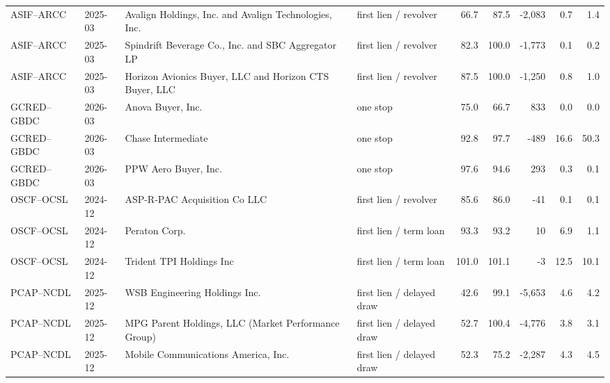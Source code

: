 \documentclass[12pt]{standalone}
\begin{document}
\begin{tabular}{ll>{\raggedright\arraybackslash}p{4.3cm}>{\raggedright\arraybackslash}p{3.1cm}rrrrr}
ASIF--ARCC & 2025-03 & Avalign Holdings, Inc. and Avalign Technologies, Inc. & first lien / revolver & 66.7 & 87.5 & -2,083 & 0.7 & 1.4 \\
ASIF--ARCC & 2025-03 & Spindrift Beverage Co., Inc. and SBC Aggregator LP & first lien / revolver & 82.3 & 100.0 & -1,773 & 0.1 & 0.2 \\
ASIF--ARCC & 2025-03 & Horizon Avionics Buyer, LLC and Horizon CTS Buyer, LLC & first lien / revolver & 87.5 & 100.0 & -1,250 & 0.8 & 1.0 \\
GCRED--GBDC & 2026-03 & Anova Buyer, Inc. & one stop & 75.0 & 66.7 & 833 & 0.0 & 0.0 \\
GCRED--GBDC & 2026-03 & Chase Intermediate & one stop & 92.8 & 97.7 & -489 & 16.6 & 50.3 \\
GCRED--GBDC & 2026-03 & PPW Aero Buyer, Inc. & one stop & 97.6 & 94.6 & 293 & 0.3 & 0.1 \\
OSCF--OCSL & 2024-12 & ASP-R-PAC Acquisition Co LLC & first lien / revolver & 85.6 & 86.0 & -41 & 0.1 & 0.1 \\
OSCF--OCSL & 2024-12 & Peraton Corp. & first lien / term loan & 93.3 & 93.2 & 10 & 6.9 & 1.1 \\
OSCF--OCSL & 2024-12 & Trident TPI Holdings Inc & first lien / term loan & 101.0 & 101.1 & -3 & 12.5 & 10.1 \\
PCAP--NCDL & 2025-12 & WSB Engineering Holdings Inc. & first lien / delayed draw & 42.6 & 99.1 & -5,653 & 4.6 & 4.2 \\
PCAP--NCDL & 2025-12 & MPG Parent Holdings, LLC (Market Performance Group) & first lien / delayed draw & 52.7 & 100.4 & -4,776 & 3.8 & 3.1 \\
PCAP--NCDL & 2025-12 & Mobile Communications America, Inc. & first lien / delayed draw & 52.3 & 75.2 & -2,287 & 4.3 & 4.5 \\
\bottomrule\end{tabular}
\end{document}
